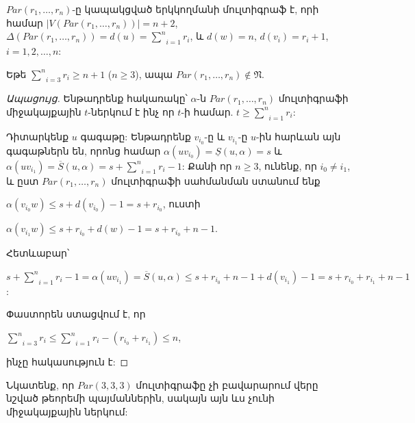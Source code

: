 $Par(r_{1},\ldots,r_{n})$-ը կապակցված երկկողմանի մուլտիգրաֆ է, որի համար $\vert V(Par(r_{1},\ldots,r_{n}))\vert=n+2$, $\Delta
(Par(r_{1},\ldots,r_{n}))=d(u)=\underset{i=1}{\overset{n}{\sum
}}r_{i}$, և $d(w)=n$, $d(v_{i})=r_{i}+1$, $i=1,2,\ldots,n$:

\begin{theorem}
\label{t3_parachute} Եթե $\underset{i=3}{\overset{n}{\sum }}r_{i}\geq
n+1$ ($n\geq 3$), ապա $Par(r_{1},\ldots,r_{n})\notin \mathfrak{N}$.
\end{theorem}
\begin{proof}[Ապացույց] Ենթադրենք հակառակը՝
$\alpha$-ն $Par(r_{1},\ldots,r_{n})$ մուլտիգրաֆի միջակայքային $t$-ներկում է ինչ որ $t$-ի համար. $t \geq \underset{i=1}{\overset{n}{\sum }}r_{i}$:

Դիտարկենք $u$ գագաթը: Ենթադրենք $v_{i_{0}}$-ը և $v_{i_{1}}$-ը $u$-ին հարևան այն գագաթներն են, որոնց համար 
$\alpha(uv_{i_{0}})=\underline{S}(u,\alpha)=s$ և
$\alpha(uv_{i_{1}})=\overline{S}(u,\alpha)=s+\underset{i=1}{\overset{n}{\sum
}}r_{i}-1$: Քանի որ $n\geq 3$, ունենք, որ $i_{0}\neq i_{1}$, և ըստ $Par(r_{1},\ldots,r_{n})$ մուլտիգրաֆի սահմանման ստանում ենք
\begin{center}
$\alpha(v_{i_{0}}w)\leq s+d(v_{i_{0}})-1=s+r_{i_{0}}$, ուստի
\end{center}
\begin{center}
$\alpha(v_{i_{1}}w)\leq s+r_{i_{0}}+d(w)-1=s+r_{i_{0}}+n-1$.
\end{center}

Հետևաբար՝
\begin{center}
$s+\underset{i=1}{\overset{n}{\sum
}}r_{i}-1=\alpha(uv_{i_{1}})=\overline{S}(u,\alpha)\leq
s+r_{i_{0}}+n-1+d(v_{i_{1}})-1=s+r_{i_{0}}+r_{i_{1}}+n-1$:
\end{center}

Փաստորեն ստացվում է, որ
\begin{center}
$\underset{i=3}{\overset{n}{\sum }}r_{i}\leq
\underset{i=1}{\overset{n}{\sum }}r_{i} - (r_{i_{0}}+r_{i_{1}})\leq
n$,
\end{center}
ինչը հակասություն է:
\end{proof}

Նկատենք, որ $Par(3,3,3)$ մուլտիգրաֆը չի բավարարում վերը նշված թեորեմի պայմաններին, սակայն այն ևս չունի միջակայքային ներկում:

